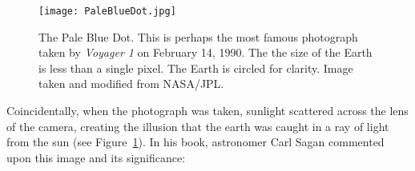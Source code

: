     \begin{figure}[ht]
    \centering
\texttt{[image: PaleBlueDot.jpg]}

        \caption{The Pale Blue Dot. This is perhaps the most famous photograph taken by \emph{Voyager 1} on February 14, 1990. The the size of the Earth is less than a single pixel. The Earth is circled for clarity. Image taken and modified from NASA/JPL.}
        \label{fig:pale_blue_dot}
    \end{figure}

    Coincidentally, when the photograph was taken, sunlight scattered across the lens of the camera, creating the illusion that the earth was caught in a ray of light from the sun (see  Figure~\ref{fig:pale_blue_dot}). In his book, astronomer Carl Sagan commented upon this image and its significance:
